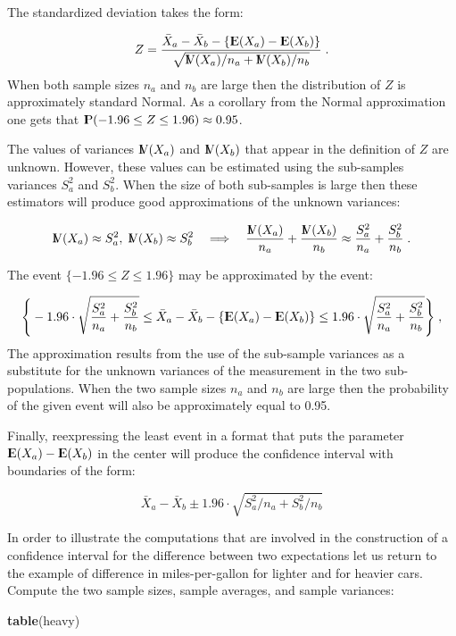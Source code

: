 \documentclass[]{krantz}
\makeatletter
\newenvironment{Shaded}{\begin{snugshade}}{\end{snugshade}}
\newcommand{\KeywordTok}[1]{\textcolor[rgb]{0.13,0.29,0.53}{\textbf{#1}}}
\newcommand{\NormalTok}[1]{#1}
\newcommand{\Expec}{{\rm I\kern-.3em E}}
\newcommand{\Prob}{{\rm I\kern-.3em P}}
\newcommand{\Var}{{\rm I\kern-.3em V}}
\newenvironment{kframe}{%
\medskip{}
\setlength{\fboxsep}{.8em}
 \def\at@end@of@kframe{}%
 \ifinner\ifhmode%
  \def\at@end@of@kframe{\end{minipage}}%
  \begin{minipage}{\columnwidth}%
 \fi\fi%
 \def\FrameCommand##1{\hskip\@totalleftmargin \hskip-\fboxsep
 \colorbox{shadecolor}{##1}\hskip-\fboxsep
     \hskip-\linewidth \hskip-\@totalleftmargin \hskip\columnwidth}%
 \MakeFramed {\advance\hsize-\width
   \@totalleftmargin\z@ \linewidth\hsize
   \@setminipage}}%
 {\par\unskip\endMakeFramed%
 \at@end@of@kframe}
\renewenvironment{Shaded}{\begin{kframe}}{\end{kframe}}
\theoremstyle{definition}
\theoremstyle{definition}
\theoremstyle{definition}
\theoremstyle{remark}
\makeatother
\begin{document}
The standardized deviation takes the form:

\[Z = \frac{\bar X_a- \bar X_b - \{\Expec(X_a)- \Expec(X_b)\}}{\sqrt{\Var(X_a)/n_a +\Var(X_b)/n_b}}\;.\]
When both sample sizes \(n_a\) and \(n_b\) are large then the distribution
of \(Z\) is approximately standard Normal. As a corollary from the Normal
approximation one gets that
\(\Prob(-1.96 \leq Z \leq 1.96) \approx 0.95\).

The values of variances \(\Var(X_a)\) and \(\Var(X_b)\) that appear in the
definition of \(Z\) are unknown. However, these values can be estimated
using the sub-samples variances \(S_a^2\) and \(S_b^2\). When the size of
both sub-samples is large then these estimators will produce good
approximations of the unknown variances:

\[\Var(X_a) \approx S_a^2,\; \Var(X_b) \approx S_b^2\quad \Longrightarrow \quad\frac{\Var(X_a)}{n_a} + \frac{\Var(X_b)}{n_b} \approx  \frac{S_a^2}{n_a} + \frac{S_b^2}{n_b}\;.\]

The event \(\{-1.96 \leq Z \leq 1.96\}\) may be approximated by the event:

\[\Bigg\{-1.96 \cdot \sqrt{\frac{S_a^2}{n_a} + \frac{S_b^2}{n_b}} \leq \bar X_a- \bar X_b - \{\Expec(X_a)- \Expec(X_b)\} \leq 1.96 \cdot \sqrt{\frac{S_a^2}{n_a} + \frac{S_b^2}{n_b}}\Bigg\}\;,\]
The approximation results from the use of the sub-sample variances as a
substitute for the unknown variances of the measurement in the two
sub-populations. When the two sample sizes \(n_a\) and \(n_b\) are large
then the probability of the given event will also be approximately equal
to 0.95.

Finally, reexpressing the least event in a format that puts the
parameter \(\Expec(X_a)- \Expec(X_b)\) in the center will produce the
confidence interval with boundaries of the form:

\[\bar X_a- \bar X_b \pm 1.96 \cdot \sqrt{S_a^2/n_a + S_b^2/n_b}\]

In order to illustrate the computations that are involved in the
construction of a confidence interval for the difference between two
expectations let us return to the example of difference in
miles-per-gallon for lighter and for heavier cars. Compute the two
sample sizes, sample averages, and sample variances:

\begin{Shaded}
\begin{Highlighting}[]
\KeywordTok{table}\NormalTok{(heavy)}
\end{Highlighting}
\end{Shaded}
\end{document}
